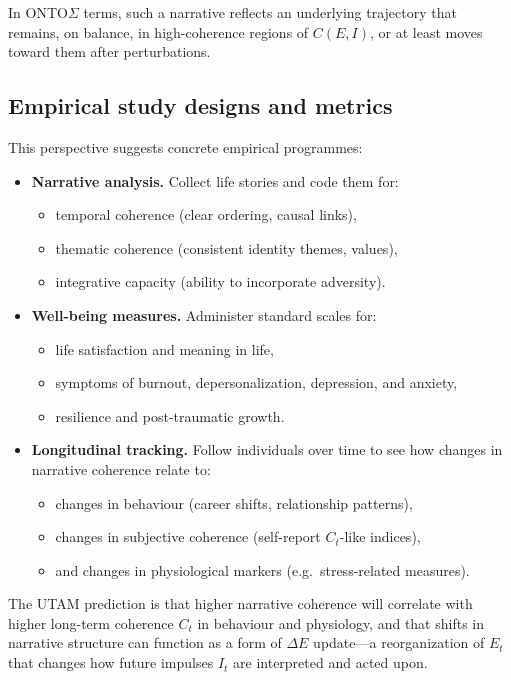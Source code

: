 \documentclass[12pt,a4paper]{report}
\begin{document}
In ONTO$\Sigma$ terms, such a narrative reflects an underlying trajectory that remains, on balance, in high-coherence regions of \(C(E, I)\), or at least moves toward them after perturbations.

\subsection*{Empirical study designs and metrics}

This perspective suggests concrete empirical programmes:

\begin{itemize}[leftmargin=2em]
    \item \textbf{Narrative analysis.} Collect life stories and code them for:
    \begin{itemize}
        \item temporal coherence (clear ordering, causal links),
        \item thematic coherence (consistent identity themes, values),
        \item integrative capacity (ability to incorporate adversity).
    \end{itemize}
    \item \textbf{Well-being measures.} Administer standard scales for:
    \begin{itemize}
        \item life satisfaction and meaning in life,
        \item symptoms of burnout, depersonalization, depression, and anxiety,
        \item resilience and post-traumatic growth.
    \end{itemize}
    \item \textbf{Longitudinal tracking.} Follow individuals over time to see how changes in narrative coherence relate to:
    \begin{itemize}
        \item changes in behaviour (career shifts, relationship patterns),
        \item changes in subjective coherence (self-report \(C_t\)-like indices),
        \item and changes in physiological markers (e.g.\ stress-related measures).
    \end{itemize}
\end{itemize}

The UTAM prediction is that higher narrative coherence will correlate with higher long-term coherence \(C_t\) in behaviour and physiology, and that shifts in narrative structure can function as a form of $\Delta E$ update---a reorganization of \(E_t\) that changes how future impulses \(I_t\) are interpreted and acted upon.
\end{document}
